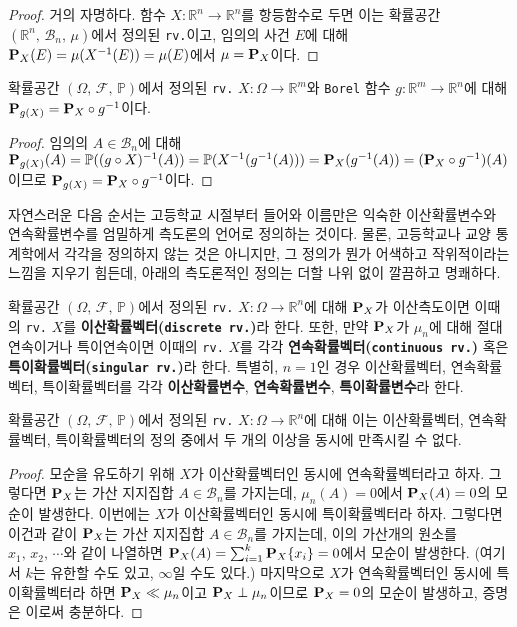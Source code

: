 \begin{proof}
    거의 자명하다. 함수 $X:\mathbb{R}^n\to\mathbb{R}^n$를 항등함수로 두면 이는 확률공간 $(\mathbb{R}^n,\,\mathcal{B}_n,\,\mu)$에서 정의된 \texttt{rv.}이고, 임의의 사건 $E$에 대해 $\mathbf{P}_X(E)=\mu(X^{-1}(E))=\mu(E)$에서 $\mu=\mathbf{P}_X$이다.
\end{proof}

\begin{theorem}
    확률공간 $(\Omega,\,\mathcal{F},\,\mathbb{P})$에서 정의된 \texttt{rv.} $X:\Omega\to\mathbb{R}^m$와 \texttt{Borel} 함수 $g:\mathbb{R}^m\to\mathbb{R}^n$에 대해 $\mathbf{P}_{g(X)}=\mathbf{P}_X\circ g^{-1}$이다.
\end{theorem}

\begin{proof}
    임의의 $A\in\mathcal{B}_n$에 대해 $\mathbf{P}_{g(X)}(A)=\mathbb{P}((g\circ X)^{-1}(A))=\mathbb{P}(X^{-1}(g^{-1}(A)))=\mathbf{P}_X(g^{-1}(A))=(\mathbf{P}_X\circ g^{-1})(A)$이므로 $\mathbf{P}_{g(X)}=\mathbf{P}_X\circ g^{-1}$이다.
\end{proof}

자연스러운 다음 순서는 고등학교 시절부터 들어와 이름만은 익숙한 이산확률변수와 연속확률변수를 엄밀하게 측도론의 언어로 정의하는 것이다. 물론, 고등학교나 교양 통계학에서 각각을 정의하지 않는 것은 아니지만, 그 정의가 뭔가 어색하고 작위적이라는 느낌을 지우기 힘든데, 아래의 측도론적인 정의는 더할 나위 없이 깔끔하고 명쾌하다.

\begin{definition}
    확률공간 $(\Omega,\,\mathcal{F},\,\mathbb{P})$에서 정의된 \texttt{rv.} $X:\Omega\to\mathbb{R}^n$에 대해 $\mathbf{P}_X$가 이산측도이면 이때의 \texttt{rv.} $X$를 \textbf{이산확률벡터(\texttt{discrete rv.})}라 한다. 또한, 만약 $\mathbf{P}_X$가 $\mu_n$에 대해 절대연속이거나 특이연속이면 이때의 \texttt{rv.} $X$를 각각 \textbf{연속확률벡터(\texttt{continuous rv.})} 혹은 \textbf{특이확률벡터(\texttt{singular rv.})}라 한다. 특별히, $n=1$인 경우 이산확률벡터, 연속확률벡터, 특이확률벡터를 각각 \textbf{이산확률변수}, \textbf{연속확률변수}, \textbf{특이확률변수}라 한다.
\end{definition}

\begin{proposition}
    확률공간 $(\Omega,\,\mathcal{F},\,\mathbb{P})$에서 정의된 \texttt{rv.} $X:\Omega\to\mathbb{R}^n$에 대해 이는 이산확률벡터, 연속확률벡터, 특이확률벡터의 정의 중에서 두 개의 이상을 동시에 만족시킬 수 없다.
\end{proposition}

\begin{proof}
    모순을 유도하기 위해 $X$가 이산확률벡터인 동시에 연속확률벡터라고 하자. 그렇다면 $\mathbf{P}_X$는 가산 지지집합 $A\in\mathcal{B}_n$를 가지는데, $\mu_n(A)=0$에서 $\mathbf{P}_X(A)=0$의 모순이 발생한다. 이번에는 $X$가 이산확률벡터인 동시에 특이확률벡터라 하자. 그렇다면 이건과 같이 $\mathbf{P}_X$는 가산 지지집합 $A\in\mathcal{B}_n$를 가지는데, 이의 가산개의 원소를 $x_1,\,x_2,\,\cdots$와 같이 나열하면 $\mathbf{P}_X(A)=\sum_{i=1}^k\mathbf{P}_X\{x_i\}=0$에서 모순이 발생한다. (여기서 $k$는 유한할 수도 있고, $\infty$일 수도 있다.) 마지막으로 $X$가 연속확률벡터인 동시에 특이확률벡터라 하면 $\mathbf{P}_X\ll\mu_n$이고 $\mathbf{P}_X\perp\mu_n$이므로 $\mathbf{P}_X=0$의 모순이 발생하고, 증명은 이로써 충분하다.
\end{proof}

